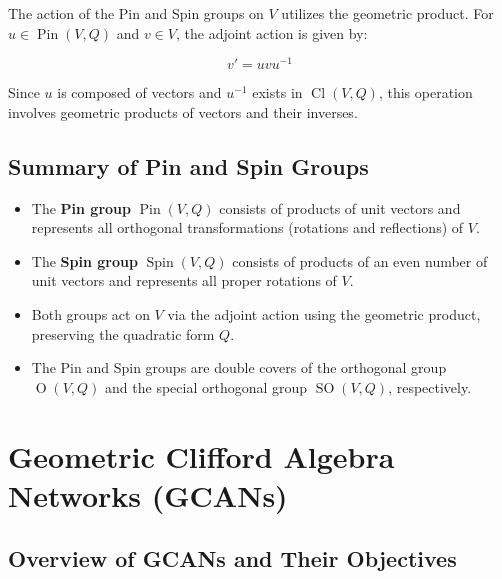 \documentclass[a4paper,14pt]{article}
\theoremstyle{plain} %
\theoremstyle{definition} %
\theoremstyle{remark} %
\theoremstyle{definition}
\theoremstyle{remark}
\theoremstyle{remark}
\begin{document}
	The action of the Pin and Spin groups on \( V \) utilizes the geometric product. For \( u \in \operatorname{Pin}(V, Q) \) and \( v \in V \), the adjoint action is given by:
	
	\[
	v' = u v u^{-1}
	\]
	
	Since \( u \) is composed of vectors and \( u^{-1} \) exists in \( \operatorname{Cl}(V, Q) \), this operation involves geometric products of vectors and their inverses.
	
	\subsection{Summary of Pin and Spin Groups}
	
	\begin{itemize}
		\item The \textbf{Pin group} \( \operatorname{Pin}(V, Q) \) consists of products of unit vectors and represents all orthogonal transformations (rotations and reflections) of \( V \).
		\item The \textbf{Spin group} \( \operatorname{Spin}(V, Q) \) consists of products of an even number of unit vectors and represents all proper rotations of \( V \).
		\item Both groups act on \( V \) via the adjoint action using the geometric product, preserving the quadratic form \( Q \).
		\item The Pin and Spin groups are double covers of the orthogonal group \( \operatorname{O}(V, Q) \) and the special orthogonal group \( \operatorname{SO}(V, Q) \), respectively.
	\end{itemize}
	
	\section{Geometric Clifford Algebra Networks (GCANs)}

	\subsection{Overview of GCANs and Their Objectives}
	
\end{document}
